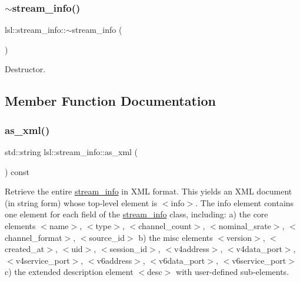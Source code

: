 \subsubsection{\texorpdfstring{$\sim$stream\+\_\+info()}{~stream\_info()}}
{\footnotesize\ttfamily lsl\+::stream\+\_\+info\+::$\sim$stream\+\_\+info (\begin{DoxyParamCaption}{ }\end{DoxyParamCaption})\hspace{0.3cm}{\ttfamily [inline]}}



Destructor. 



\subsection{Member Function Documentation}
\mbox{\label{classlsl_1_1stream__info_ab1ccb9c2a1945c7051a0e90edaba8996}} 
\subsubsection{\texorpdfstring{as\+\_\+xml()}{as\_xml()}}
{\footnotesize\ttfamily std\+::string lsl\+::stream\+\_\+info\+::as\+\_\+xml (\begin{DoxyParamCaption}{ }\end{DoxyParamCaption}) const\hspace{0.3cm}{\ttfamily [inline]}}

Retrieve the entire \hyperlink{classlsl_1_1stream__info}{stream\+\_\+info} in X\+ML format. This yields an X\+ML document (in string form) whose top-\/level element is $<$info$>$. The info element contains one element for each field of the \hyperlink{classlsl_1_1stream__info}{stream\+\_\+info} class, including\+: a) the core elements $<$name$>$, $<$type$>$, $<$channel\+\_\+count$>$, $<$nominal\+\_\+srate$>$, $<$channel\+\_\+format$>$, $<$source\+\_\+id$>$ b) the misc elements $<$version$>$, $<$created\+\_\+at$>$, $<$uid$>$, $<$session\+\_\+id$>$, $<$v4address$>$, $<$v4data\+\_\+port$>$, $<$v4service\+\_\+port$>$, $<$v6address$>$, $<$v6data\+\_\+port$>$, $<$v6service\+\_\+port$>$ c) the extended description element $<$desc$>$ with user-\/defined sub-\/elements. \mbox{\label{classlsl_1_1stream__info_a7eb192e1913596b017137347e4cc5847}} 
